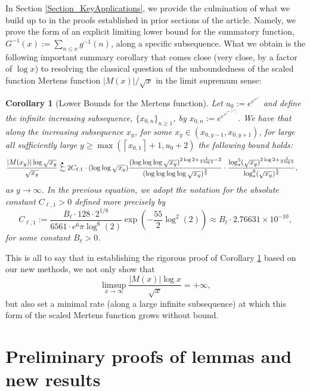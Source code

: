 \documentclass[11pt,reqno,a4letter]{article}
\numberwithin{figure}{section}
\numberwithin{table}{section}
\newcommand{\ceiling}[1]{\left\lceil #1 \right\rceil}
\theoremstyle{plain}
\newtheorem{cor}[theorem]{Corollary}
\numberwithin{theorem}{section}
\theoremstyle{definition}
\newcommand{\SuccSim}[0]{\overset{_{\scriptsize{\blacktriangle}}}{\succsim}}
\begin{document}
In Section \ref{Section_KeyApplications}, 
we provide the culmination of what we build up to in the proofs established in 
prior sections of the article. 
Namely, we prove the form of an explicit limiting lower bound for the 
summatory function, $G^{-1}(x) := \sum_{n \leq x} g^{-1}(n)$, along a specific subsequence. 
What we obtain is the following important summary corollary that comes close 
(very close, by a factor of $\log x$) to resolving the classical question of the 
unboundedness of the scaled function Mertens function 
$|M(x)| / \sqrt{x}$ in the limit supremum sense: 

\begin{cor}[Lower Bounds for the Mertens function] 
\label{cor_ThePipeDreamResult_v1} 
Let $u_0 := e^{e^{e^{e^{e^{e}}}}}$ and define the infinite increasing subsequence, 
$\{x_{0,n}\}_{n \geq 1}$, by $x_{0,n} := e^{e^{e^{e^{4n \cdot \ceiling{e^{e^{4n}}}}}}}$. 
We have that along the increasing subsequence $x_y$, for some 
$x_y \in \left(x_{0,y-1}, x_{0,y+1}\right)$, for large all sufficiently large 
$y \geq \max\left(\ceiling{x_{0,1}}+1, u_0+2\right)$ the following bound holds: 
\begin{align*} 
\frac{|M(x_y)| \log \sqrt{x_y}}{\sqrt{x_y}} & \SuccSim 
     2C_{\ell,1} \cdot (\log\log \sqrt{x_y}) 
     \frac{(\log\log\log \sqrt{x_y})^{2\log 2+\frac{1}{3\log 2} - 2}}{ 
     (\log\log\log\log \sqrt{x_y})^{\frac{5}{2}}} \cdot 
     \frac{\log_{\ast}^5(\sqrt{x_y})^{2\log 2 + \frac{1}{3\log 2}}}{ 
     \log_{\ast}^{6}(\sqrt{x_y})^{\frac{5}{2}}},  
\end{align*} 
as $y \rightarrow \infty$. In the previous equation, we adopt the notation for the 
absolute constant $C_{\ell,1} > 0$ defined more precisely by 
\[
C_{\ell,1} := \frac{B_{\ell} \cdot 128 \cdot 2^{1/8}}{6561 \cdot e^6 \pi \log^6(2)} 
     \exp\left(-\frac{55}{2} \log^2(2)\right) 
     \approx B_{\ell} \cdot 2.76631 \times 10^{-10}, 
\]
for some constant $B_{\ell} > 0$. 
\end{cor} 

This is all to say that in establishing the rigorous proof of 
Corollary \ref{cor_ThePipeDreamResult_v1} 
based on our new methods, we not only show that 
\[
\limsup_{x \rightarrow \infty} \frac{|M(x)| \log x}{\sqrt{x}} = +\infty, 
\]
but also set a minimal rate (along a large infinite subsequence) at which this form of the 
scaled Mertens function grows without bound. 

\newpage 
\section{Preliminary proofs of lemmas and new results} 
\label{Section_PrelimProofs_Config} 
\end{document}
